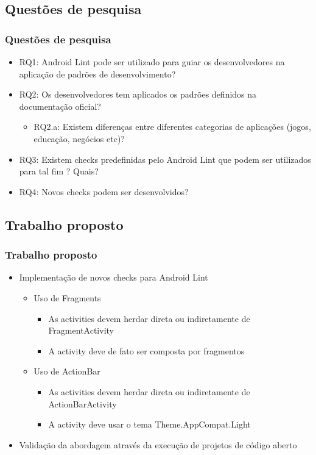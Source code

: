 \documentclass{beamer}
\begin{document}
    \subsection{Questões de pesquisa}
    \frame
    {
        \frametitle{Questões de pesquisa}
        \begin{itemize}
            \item RQ1: Android Lint pode ser utilizado para guiar os desenvolvedores
                na aplicação de padrões de desenvolvimento?
            \item RQ2: Os desenvolvedores tem aplicados os padrões definidos na
                documentação oficial?
                \begin{itemize}
                    \item RQ2.a: Existem diferenças entre diferentes categorias
                    de aplicações (jogos, educação, negócios etc)?
                \end{itemize}
            \item RQ3: Existem checks predefinidas pelo Android Lint que podem ser
                utilizados para tal fim ? Quais?
            \item RQ4: Novos checks podem ser desenvolvidos?
        \end{itemize}
    }
    
    \subsection{Trabalho proposto}
    \frame
    {
        \frametitle{Trabalho proposto}
        \begin{itemize}
            \item Implementação de novos checks para Android Lint
            \begin{itemize}
            \item Uso de Fragments
                \begin{itemize}
                    \item As activities devem herdar direta ou indiretamente de FragmentActivity
                    \item A activity deve de fato ser composta por fragmentos
                \end{itemize}
            \item Uso de ActionBar
                \begin{itemize}
                    \item As activities devem herdar direta ou indiretamente de ActionBarActivity
                    \item A activity deve usar o tema Theme.AppCompat.Light
                \end{itemize}
            \end{itemize}
            \item{Validação da abordagem através da execução de projetos de código aberto}
        \end{itemize}
    }
    
\end{document}
